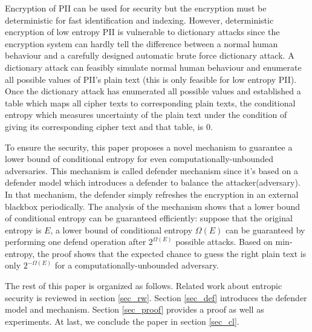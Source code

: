 \documentclass[10pt, conference, compsocconf]{IEEEtran}
\begin{document}
	Encryption of PII can be used for security but
	the encryption must be deterministic for fast identification and indexing.
	However, deterministic encryption of low entropy PII is
    vulnerable to dictionary attacks since the encryption system can hardly tell
    the difference between a normal human behaviour and a carefully
    designed automatic brute force dictionary attack. A dictionary
    attack can feasibly simulate normal human behaviour and enumerate all
    possible values of PII's plain text (this is only feasible for low entropy PII).
    Once the dictionary attack has enumerated all possible values
    and established a table which maps all cipher texts
    to corresponding plain texts, the conditional entropy \cite{math_book, info_measure}
    which measures uncertainty of the plain text under the condition of giving
    its corresponding cipher text and that table, is $0$.

	To ensure the security,
	this paper proposes a novel mechanism to guarantee a
	lower bound of conditional entropy for even computationally-unbounded
	adversaries. This mechanism is called defender mechanism
	since it's based on a defender model which introduces
	a defender to balance the attacker(adversary). 
	In that mechanism, the defender simply refreshes
	the encryption in an external blackbox periodically.
    The analysis of the mechanism shows that a lower bound
    of conditional entropy can be guaranteed efficiently: suppose that the original entropy
    is $E$, a lower bound of conditional entropy $\Omega(E)$ can be guaranteed
    by performing one defend operation after $2^{\Omega(E)}$
    possible attacks. Based on min-entropy, the proof shows that
    the expected chance to guess the right plain text is only $2^{-\Omega(E)}$ for
    a computationally-unbounded adversary.


    The rest of this paper is organized as follows.
    Related work about entropic security
	is reviewed in section \ref{sec_rw}.
	Section \ref{sec_def} introduces the defender model and mechanism.
    Section \ref{sec_proof} provides a proof as well as experiments.
    At last, we conclude the paper in section \ref{sec_cl}.
\end{document}
